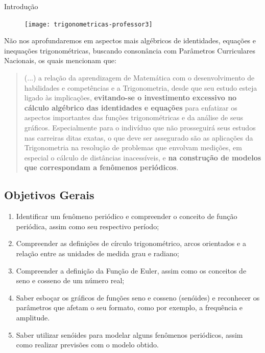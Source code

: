 \begin{apresentacao}{Introdução}
\begin{figure}[H]
\centering

\texttt{[image: trigonometricas-professor3]}
\end{figure}

Não nos aprofundaremos em aspectos mais algébricos de identidades, equações e inequações trigonométricas, buscando consonância com Parâmetros Curriculares Nacionais, os quais mencionam que:

\begin{quote}

(...) a relação da aprendizagem de Matemática com o desenvolvimento de habilidades e competências e a Trigonometria, desde que seu estudo esteja ligado às implicações, \textbf{evitando-se o investimento excessivo no cálculo algébrico das identidades e equações} para enfatizar os aspectos importantes das funções trigonométricas e da análise de seus gráficos. Especialmente para o indivíduo que não prosseguirá seus estudos nas carreiras ditas exatas, o que deve ser assegurado são as aplicações da Trigonometria na resolução de problemas que envolvam medições, em especial o cálculo de distâncias inacessíveis, e \textbf{na construção de modelos que correspondam a fenômenos periódicos}. 

\flushright
\citep[grifo nosso]{PCNEM2000}
\end{quote}


\subsection{Objetivos Gerais}

\begin{enumerate}[label=\titem{\arabic*.}]
\item Identificar um fenômeno periódico e compreender o conceito de função periódica, assim como seu respectivo período;
\item Compreender as definições de círculo trigonométrico, arcos orientados e a relação entre as unidades de medida grau e radiano;
\item Compreender a definição da Função de Euler, assim como os conceitos de seno e cosseno de um número real;
\item Saber esboçar os gráficos de funções seno e cosseno (senóides) e reconhecer os parâmetros que afetam o seu formato, como por exemplo, a frequência e amplitude.
\item Saber utilizar senóides para modelar alguns fenômenos periódicos, assim como realizar previsões com o modelo obtido.
\end{enumerate}




\end{apresentacao}


